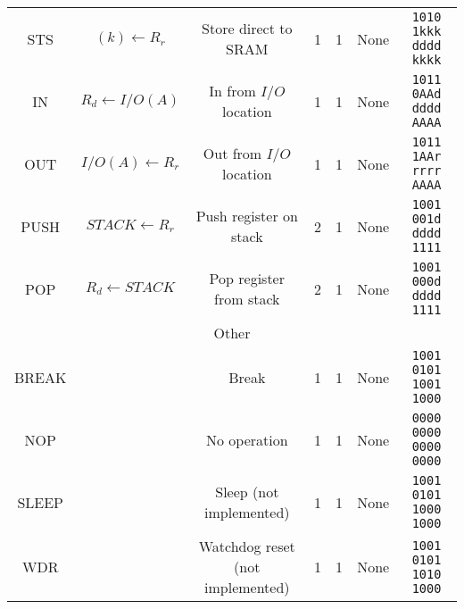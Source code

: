 \documentclass[11pt]{article}
\begin{document}
\begin{center}
\begin{longtable}{|c|c|c|c|c|c|c|}
STS & $(k) \leftarrow R_r$ & Store direct to SRAM & 1 & 1 & None & \texttt{1010 1kkk dddd kkkk}\\
IN & $R_d \leftarrow I/O(A)$ & In from $I/O$ location & 1 & 1 & None & \texttt{1011 0AAd dddd AAAA}\\
OUT & $I/O(A) \leftarrow R_r$ & Out from $I/O$ location & 1 & 1 & None & \texttt{1011 1AAr rrrr AAAA}\\
PUSH & $STACK \leftarrow R_r$ & Push register on stack & 2 & 1 & None & \texttt{1001 001d dddd 1111}\\
POP & $R_d \leftarrow STACK$ & Pop register from stack & 2 & 1 & None & \texttt{1001 000d dddd 1111}\\
\hline\hline
\multicolumn{7}{|c|}{Other} \\
\hline
BREAK &  &  Break & 1 & 1 & None & \texttt{1001 0101 1001 1000}\\
NOP &  &  No operation & 1 & 1 & None & \texttt{0000 0000 0000 0000}\\
SLEEP &  & Sleep (not implemented) & 1 & 1 & None & \texttt{1001 0101 1000 1000}\\
WDR &  & Watchdog reset (not implemented) & 1 & 1 & None & \texttt{1001 0101 1010 1000}\\
\hline
\end{longtable}
\end{center}
\end{document}
